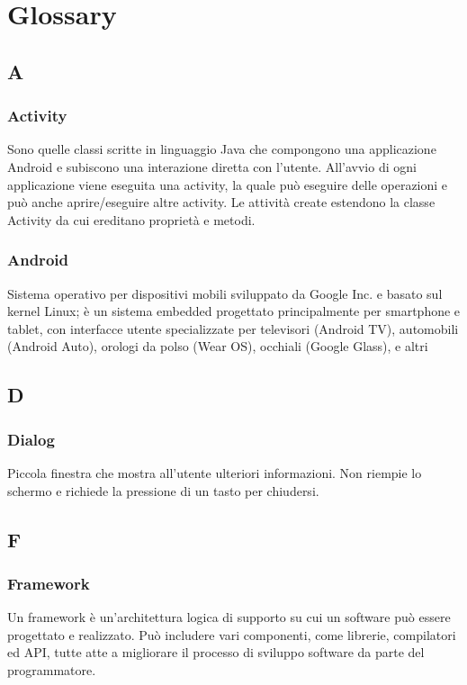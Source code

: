 \section{Glossary}
\subsection*{A}
\subsubsection*{Activity}
Sono quelle classi scritte in linguaggio Java che compongono una applicazione Android e subiscono
una interazione diretta con l'utente. All'avvio di ogni applicazione viene eseguita una activity, la
quale può eseguire delle operazioni e può anche aprire/eseguire altre activity. Le attività create
estendono la classe Activity da cui ereditano proprietà e metodi.

\subsubsection*{Android}
Sistema operativo per dispositivi mobili sviluppato da Google Inc. e basato sul kernel Linux; è
un sistema embedded progettato principalmente per smartphone e tablet, con interfacce utente
specializzate per televisori (Android TV), automobili (Android Auto), orologi da polso (Wear
OS), occhiali (Google Glass), e altri

\subsection*{D}
\subsubsection*{Dialog}
Piccola finestra che mostra all'utente ulteriori informazioni. Non riempie lo schermo e richiede la pressione di un tasto per chiudersi.

\subsection*{F}
\subsubsection*{Framework}
Un framework è un'architettura logica di supporto su cui un software può essere progettato e
realizzato. Può includere vari componenti, come librerie, compilatori ed API, tutte atte a
migliorare il processo di sviluppo software da parte del programmatore.

